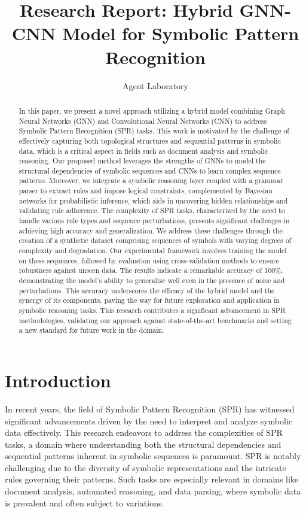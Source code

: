\documentclass{article}
\title{Research Report: Hybrid GNN-CNN Model for Symbolic Pattern Recognition}
\author{Agent Laboratory}
\date{}
\begin{document}
\maketitle

\begin{abstract}
In this paper, we present a novel approach utilizing a hybrid model combining Graph Neural Networks (GNN) and Convolutional Neural Networks (CNN) to address Symbolic Pattern Recognition (SPR) tasks. This work is motivated by the challenge of effectively capturing both topological structures and sequential patterns in symbolic data, which is a critical aspect in fields such as document analysis and symbolic reasoning. Our proposed method leverages the strengths of GNNs to model the structural dependencies of symbolic sequences and CNNs to learn complex sequence patterns. Moreover, we integrate a symbolic reasoning layer coupled with a grammar parser to extract rules and impose logical constraints, complemented by Bayesian networks for probabilistic inference, which aids in uncovering hidden relationships and validating rule adherence. The complexity of SPR tasks, characterized by the need to handle various rule types and sequence perturbations, presents significant challenges in achieving high accuracy and generalization. We address these challenges through the creation of a synthetic dataset comprising sequences of symbols with varying degrees of complexity and degradation. Our experimental framework involves training the model on these sequences, followed by evaluation using cross-validation methods to ensure robustness against unseen data. The results indicate a remarkable accuracy of 100\%, demonstrating the model's ability to generalize well even in the presence of noise and perturbations. This accuracy underscores the efficacy of the hybrid model and the synergy of its components, paving the way for future exploration and application in symbolic reasoning tasks. This research contributes a significant advancement in SPR methodologies, validating our approach against state-of-the-art benchmarks and setting a new standard for future work in the domain.
\end{abstract}

\section{Introduction}
In recent years, the field of Symbolic Pattern Recognition (SPR) has witnessed significant advancements driven by the need to interpret and analyze symbolic data effectively. This research endeavors to address the complexities of SPR tasks, a domain where understanding both the structural dependencies and sequential patterns inherent in symbolic sequences is paramount. SPR is notably challenging due to the diversity of symbolic representations and the intricate rules governing their patterns. Such tasks are especially relevant in domains like document analysis, automated reasoning, and data parsing, where symbolic data is prevalent and often subject to variations.
\end{document}
